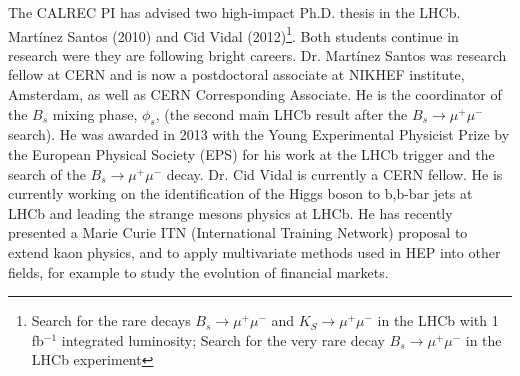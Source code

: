 The CALREC PI has advised two high-impact Ph.D. thesis in the LHCb. Martínez Santos
(2010) and Cid Vidal (2012)\footnote{Search for the rare decays $B_s \to \mu^+\mu^-$
and $K_S \to \mu^+\mu^-$ in the LHCb with 1 fb$^{-1}$ integrated luminosity; Search for the very rare decay $B_s \to \mu^+\mu^-$ in the LHCb experiment}. Both students continue in research were they are following bright careers.   
Dr. Mart\'inez Santos was research fellow at CERN and is now a postdoctoral associate at NIKHEF institute, Amsterdam, as well as CERN Corresponding Associate. He is the coordinator of the $B_s$ mixing phase, $\phi_s$, (the second main LHCb result after the $B_s \to \mu^+\mu^-$ search). He was awarded in 2013 with the Young Experimental Physicist Prize by the European Physical Society (EPS) for his work at the LHCb trigger and the search of the $B_s \to \mu^+ \mu^-$ decay. Dr. Cid Vidal is currently a CERN fellow. He is currently working on the identification of the Higgs boson to b,b-bar jets at LHCb and leading the strange mesons physics at LHCb. He has recently presented a Marie Curie ITN  (International Training Network) proposal to extend kaon physics, and to apply multivariate methods used in HEP into other fields, for example to study the evolution of financial markets.
 

